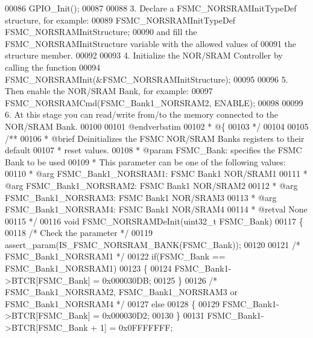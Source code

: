 \begin{DoxyCode}
00086 \textcolor{comment}{          GPIO\_Init();    }
00087 \textcolor{comment}{       }
00088 \textcolor{comment}{   3. Declare a FSMC\_NORSRAMInitTypeDef structure, for example:}
00089 \textcolor{comment}{          FSMC\_NORSRAMInitTypeDef  FSMC\_NORSRAMInitStructure;}
00090 \textcolor{comment}{      and fill the FSMC\_NORSRAMInitStructure variable with the allowed values of}
00091 \textcolor{comment}{      the structure member.}
00092 \textcolor{comment}{      }
00093 \textcolor{comment}{   4. Initialize the NOR/SRAM Controller by calling the function}
00094 \textcolor{comment}{          FSMC\_NORSRAMInit(&FSMC\_NORSRAMInitStructure); }
00095 \textcolor{comment}{}
00096 \textcolor{comment}{   5. Then enable the NOR/SRAM Bank, for example:}
00097 \textcolor{comment}{          FSMC\_NORSRAMCmd(FSMC\_Bank1\_NORSRAM2, ENABLE);  }
00098 \textcolor{comment}{}
00099 \textcolor{comment}{   6. At this stage you can read/write from/to the memory connected to the NOR/SRAM Bank. }
00100 \textcolor{comment}{   }
00101 \textcolor{comment}{@endverbatim}
00102 \textcolor{comment}{  * @\{}
00103 \textcolor{comment}{  */}
00104 
00105 \textcolor{comment}{/**}
00106 \textcolor{comment}{  * @brief  Deinitializes the FSMC NOR/SRAM Banks registers to their default }
00107 \textcolor{comment}{  *   reset values.}
00108 \textcolor{comment}{  * @param  FSMC\_Bank: specifies the FSMC Bank to be used}
00109 \textcolor{comment}{  *          This parameter can be one of the following values:}
00110 \textcolor{comment}{  *            @arg FSMC\_Bank1\_NORSRAM1: FSMC Bank1 NOR/SRAM1  }
00111 \textcolor{comment}{  *            @arg FSMC\_Bank1\_NORSRAM2: FSMC Bank1 NOR/SRAM2 }
00112 \textcolor{comment}{  *            @arg FSMC\_Bank1\_NORSRAM3: FSMC Bank1 NOR/SRAM3 }
00113 \textcolor{comment}{  *            @arg FSMC\_Bank1\_NORSRAM4: FSMC Bank1 NOR/SRAM4 }
00114 \textcolor{comment}{  * @retval None}
00115 \textcolor{comment}{  */}
00116 \textcolor{keywordtype}{void} FSMC_NORSRAMDeInit(uint32\_t FSMC\_Bank)
00117 \{
00118   \textcolor{comment}{/* Check the parameter */}
00119   assert_param(IS\_FSMC\_NORSRAM\_BANK(FSMC\_Bank));
00120 
00121   \textcolor{comment}{/* FSMC\_Bank1\_NORSRAM1 */}
00122   \textcolor{keywordflow}{if}(FSMC\_Bank == FSMC_Bank1_NORSRAM1)
00123   \{
00124     FSMC_Bank1->BTCR[FSMC\_Bank] = 0x000030DB;
00125   \}
00126   \textcolor{comment}{/* FSMC\_Bank1\_NORSRAM2,  FSMC\_Bank1\_NORSRAM3 or FSMC\_Bank1\_NORSRAM4 */}
00127   \textcolor{keywordflow}{else}
00128   \{
00129     FSMC_Bank1->BTCR[FSMC\_Bank] = 0x000030D2;
00130   \}
00131   FSMC_Bank1->BTCR[FSMC\_Bank + 1] = 0x0FFFFFFF;

\end{DoxyCode}
